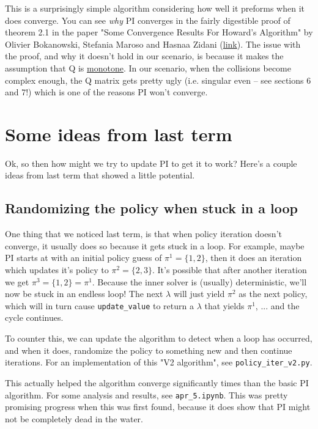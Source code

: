 \documentclass[12pt]{article}
\begin{document}
This is a surprisingly simple algorithm considering how well it preforms
when it does converge. You can see \textit{why} PI converges
in the fairly digestible proof of theorem 2.1 in the paper "Some Convergence Results For Howard's Algorithm"
by Olivier Bokanowski, Stefania Maroso and Hasnaa Zidani
(\href{https://www.jstor.org/stable/27862763}{link}).
The issue with the proof, and why it doesn't hold in our scenario,
is because it makes the assumption that Q is \href{URLhttps://en.wikipedia.org/wiki/Monotone_matrix}{monotone}.
In our scenario, when the collisions become complex enough, the Q matrix gets pretty ugly
(i.e. singular even -- see sections 6 and 7!) which is one of the reasons PI won't converge.

\section{Some ideas from last term}

Ok, so then how might we try to update PI to get it to work?
Here's a couple ideas from last term that showed a little potential.

\subsection{Randomizing the policy when stuck in a loop}

One thing that we noticed last term, is that when policy iteration doesn't converge,
it usually does so because it gets stuck in a loop. For example,
maybe PI starts at with an initial policy guess of $\pi^1 = \{1, 2\}$,
then it does an iteration which updates it's policy to $\pi^2 = \{2, 3\}$.
It's possible that after another iteration we get $\pi^3 = \{1,2\} = \pi^1$.
Because the inner solver is (usually) deterministic, we'll now be stuck in an endless loop!
The next $\lambda$ will just yield $\pi^2$ as the next policy, which will in turn
cause \texttt{update\_value} to return a $\lambda$ that yields $\pi^1$, ... and the cycle continues.

To counter this, we can update the algorithm to detect when a loop has occurred,
and when it does, randomize the policy to something new and then continue iterations.
For an implementation of this "V2 algorithm", see \texttt{policy\_iter\_v2.py}.

This actually helped the algorithm converge significantly times than the basic PI algorithm.
For some analysis and results, see \texttt{apr\_5.ipynb}. This was pretty promising progress
when this was first found, because it does show that PI might not be completely dead in the water.
\end{document}
